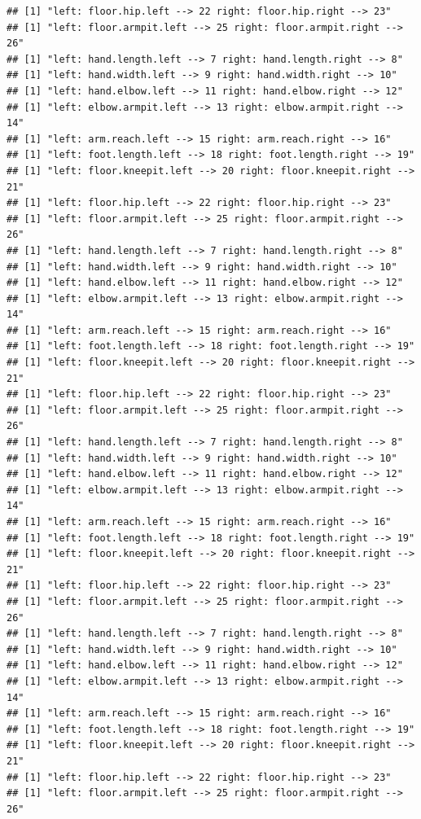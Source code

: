 \documentclass[]{article}
\begin{document}
\begin{verbatim}
## [1] "left: floor.hip.left --> 22 right: floor.hip.right --> 23"
## [1] "left: floor.armpit.left --> 25 right: floor.armpit.right --> 26"
## [1] "left: hand.length.left --> 7 right: hand.length.right --> 8"
## [1] "left: hand.width.left --> 9 right: hand.width.right --> 10"
## [1] "left: hand.elbow.left --> 11 right: hand.elbow.right --> 12"
## [1] "left: elbow.armpit.left --> 13 right: elbow.armpit.right --> 14"
## [1] "left: arm.reach.left --> 15 right: arm.reach.right --> 16"
## [1] "left: foot.length.left --> 18 right: foot.length.right --> 19"
## [1] "left: floor.kneepit.left --> 20 right: floor.kneepit.right --> 21"
## [1] "left: floor.hip.left --> 22 right: floor.hip.right --> 23"
## [1] "left: floor.armpit.left --> 25 right: floor.armpit.right --> 26"
## [1] "left: hand.length.left --> 7 right: hand.length.right --> 8"
## [1] "left: hand.width.left --> 9 right: hand.width.right --> 10"
## [1] "left: hand.elbow.left --> 11 right: hand.elbow.right --> 12"
## [1] "left: elbow.armpit.left --> 13 right: elbow.armpit.right --> 14"
## [1] "left: arm.reach.left --> 15 right: arm.reach.right --> 16"
## [1] "left: foot.length.left --> 18 right: foot.length.right --> 19"
## [1] "left: floor.kneepit.left --> 20 right: floor.kneepit.right --> 21"
## [1] "left: floor.hip.left --> 22 right: floor.hip.right --> 23"
## [1] "left: floor.armpit.left --> 25 right: floor.armpit.right --> 26"
## [1] "left: hand.length.left --> 7 right: hand.length.right --> 8"
## [1] "left: hand.width.left --> 9 right: hand.width.right --> 10"
## [1] "left: hand.elbow.left --> 11 right: hand.elbow.right --> 12"
## [1] "left: elbow.armpit.left --> 13 right: elbow.armpit.right --> 14"
## [1] "left: arm.reach.left --> 15 right: arm.reach.right --> 16"
## [1] "left: foot.length.left --> 18 right: foot.length.right --> 19"
## [1] "left: floor.kneepit.left --> 20 right: floor.kneepit.right --> 21"
## [1] "left: floor.hip.left --> 22 right: floor.hip.right --> 23"
## [1] "left: floor.armpit.left --> 25 right: floor.armpit.right --> 26"
## [1] "left: hand.length.left --> 7 right: hand.length.right --> 8"
## [1] "left: hand.width.left --> 9 right: hand.width.right --> 10"
## [1] "left: hand.elbow.left --> 11 right: hand.elbow.right --> 12"
## [1] "left: elbow.armpit.left --> 13 right: elbow.armpit.right --> 14"
## [1] "left: arm.reach.left --> 15 right: arm.reach.right --> 16"
## [1] "left: foot.length.left --> 18 right: foot.length.right --> 19"
## [1] "left: floor.kneepit.left --> 20 right: floor.kneepit.right --> 21"
## [1] "left: floor.hip.left --> 22 right: floor.hip.right --> 23"
## [1] "left: floor.armpit.left --> 25 right: floor.armpit.right --> 26"

\end{verbatim}
\end{document}
